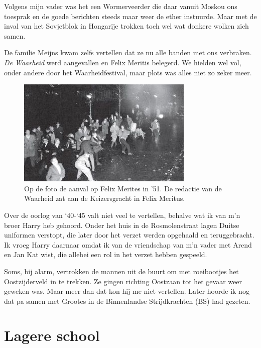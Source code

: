 \documentclass[10pt,twoside, openright]{memoir}
\begin{document}
Volgens mijn vader was het een Wormerveerder die daar vanuit Moskou ons toesprak en de goede berichten steeds maar weer de ether instuurde. Maar met de inval van het Sovjetblok in Hongarije trokken toch wel wat donkere wolken zich samen. 

De familie Meijns kwam zelfs vertellen dat ze nu alle banden met ons verbraken. \emph{De Waarheid} werd aangevallen en Felix Meritis belegerd. We hielden wel vol, onder andere door het Waarheidfestival, maar plots was alles niet zo zeker meer.

\begin{figure}
\includegraphics[width=\textwidth]{img/ch17/Felix_Meritis1}
\caption*{\footnotesize Op de foto de aanval op Felix Merites in ’51. De redactie van de Waarheid zat aan de Keizersgracht in Felix Meritus.}
\end{figure}

Over de oorlog van `40-`45 valt niet veel te vertellen, behalve wat ik van m’n broer Harry heb gehoord. Onder het huis in de Rosmolenstraat lagen Duitse uniformen verstopt, die later door het verzet werden opgehaald en teruggebracht. Ik vroeg Harry daarnaar omdat ik van de vriendschap van m’n vader met Arend en Jan Kat wist, die allebei een rol in het verzet hebben gespeeld. 

Soms, bij alarm, vertrokken de mannen uit de buurt om met roeibootjes het Oostzijderveld in te trekken. Ze gingen richting Oostzaan tot het gevaar weer geweken was. Maar meer dan dat kon hij me niet vertellen. Later hoorde ik nog dat pa samen met Grootes in de Binnenlandse Strijdkrachten (BS) had gezeten.

\chapter{Lagere school} %
\label{cha:lagere_school}
\end{document}
